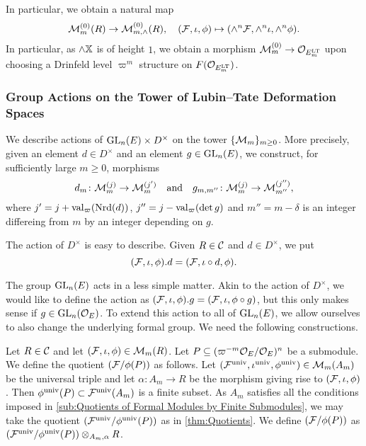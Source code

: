 \documentclass[../main.tex]{subfiles}
\begin{document}
In particular, we obtain a natural map
\begin{equation*}
  \mathcal{M}_m^{(0)}(R) \to \mathcal{M}^{(0)}_{m, \wedge}(R), \quad (\mathcal{F}, \iota, \phi)
  \mapsto (\wedge^n \mathcal{F}, \wedge^n \iota, \wedge^n \phi).
\end{equation*}
In particular, as $\wedge \mathbb{X}$ is of height $1$, we obtain a morphism $\mathcal{M}_m^{(0)}
\to \mathcal{O}_{E^{\mathrm{LT}}_m}$ upon choosing a Drinfeld level
$\varpi^m$ structure on $F(\mathcal{O}_{E^{\mathrm{LT}}_m})$. 

\subsubsection{Group Actions on the Tower of Lubin--Tate Deformation Spaces} %
\label{ssub:Group Actions on the Tower of Lubin--Tate Deformation Spaces}
We describe actions of $\operatorname{GL}_n(E) \times D^\times$ on the tower
$\{\mathcal{M}_m\}_{m \geq 0}$. More precisely, given an element $d \in D^\times$ and an element
$g \in \operatorname{GL}_n(E)$, we construct, for sufficiently large $m\geq 0$, morphisms
\begin{equation*}
  d_m \colon \mathcal{M}_m^{(j)} \to \mathcal{M}_m^{(j')} \quad \text{and} \quad
  g_{m,m''} \colon \mathcal{M}_m^{(j)} \to \mathcal{M}_{m''}^{(j'')},
\end{equation*}
where $j'= j+\mathrm{val}_\varpi(\operatorname{Nrd}(d))$, $j'' = j - \mathrm{val}_\varpi(\det g)$ and $m''
= m-\delta$ is an integer differeing from $m$ by an integer depending on $g$. 

The action of $D^\times$ is easy to describe. Given $R \in \mathcal{C}$ and 
$d \in D^\times$, we put
\begin{equation*}
  (\mathcal{F}, \iota, \phi).d = (\mathcal{F}, \iota \circ d, \phi).
\end{equation*}

The group $\operatorname{GL}_n(E)$ acts in a less simple matter. Akin to the action of
$D^\times$, we would like to define the action as
$(\mathcal{F}, \iota, \phi).g = (\mathcal{F}, \iota, \phi \circ g)$, but this only makes sense
if $g \in \operatorname{GL}_n(\mathcal{O}_E)$. To extend this action to all of $\operatorname{GL}_n(E)$, we
allow ourselves to also change the underlying formal group.
We need the following constructions.

\begin{defi}\label{def:QuotientModule}
  Let $R \in \mathcal{C}$ and let $(\mathcal{F}, \iota, \phi) \in \mathcal{M}_m(R)$. Let
  $P \subseteq (\varpi^{-m}\mathcal{O}_E/\mathcal{O}_E)^n$ be a submodule.
  We define the quotient $(\mathcal{F}/\phi(P))$ as follows. Let 
  $(\mathcal{F}^{\mathrm{univ}}, \iota^{\mathrm{univ}}, \phi^{{\mathrm{univ}}}) \in \mathcal{M}_m(A_m)$ be the universal 
  triple and let $\alpha\colon A_m \to R$ be the morphism giving rise to
  $(\mathcal{F}, \iota, \phi)$. Then $\phi^{\mathrm{univ}}(P) \subset \mathcal{F}^{\mathrm{univ}}(A_m)$ is a 
  finite subset. As $A_m$ satisfies all the conditions imposed in
  \cref{sub:Quotients of Formal Modules by Finite Submodules}, we may take the quotient
  $(\mathcal{F}^{\mathrm{univ}}/\phi^{\mathrm{univ}}(P))$ as in \cref{thm:Quotients}. We define
  $(\mathcal{F}/\phi(P))$ as $(\mathcal{F}^{\mathrm{univ}}/\phi^{\mathrm{univ}}(P))\otimes_{A_m,\alpha} R$. 
\end{defi}
\end{document}
